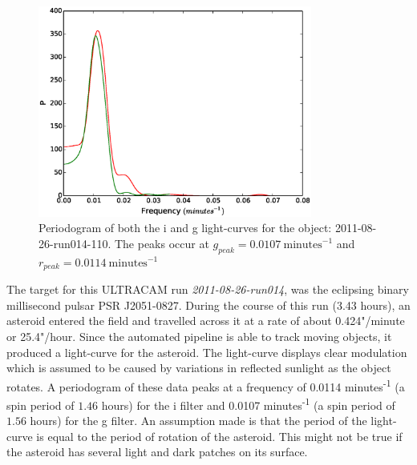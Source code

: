 \begin{figure}
  \center
  \includegraphics[width=90mm]{images/2011-08-26-run014-110-pgram-bin4.eps} 
  \caption{Periodogram of both the i and g light-curves for the object: 2011-08-26-run014-110. The peaks occur at $g_{peak} = 0.0107 \ \mbox{minutes}^{-1}$ and  $r_{peak} = 0.0114\ \mbox{minutes}^{-1}$ }
  \label{fig:asteroidpgram}
\end{figure}

  
The target for this ULTRACAM run \emph{2011-08-26-run014}, was the eclipsing binary millisecond pulsar PSR J2051-0827. During the course of this run (3.43 hours), an asteroid entered the field and travelled across it at a rate of about 0.424"/minute or 25.4"/hour. Since the automated pipeline is able to track moving objects, it produced a light-curve for the asteroid. The light-curve displays clear modulation which is assumed to be caused by variations in reflected sunlight as the object rotates. A periodogram of these data peaks at a frequency of 0.0114 minutes\textsuperscript{-1} (a spin period of $1.46$ hours) for the i filter and 0.0107 minutes\textsuperscript{-1} (a spin period of $1.56$ hours) for the g filter. An assumption made is that the period of the light-curve is equal to the period of rotation of  the asteroid. This might not be true if the asteroid has several light and dark patches on its surface. 

